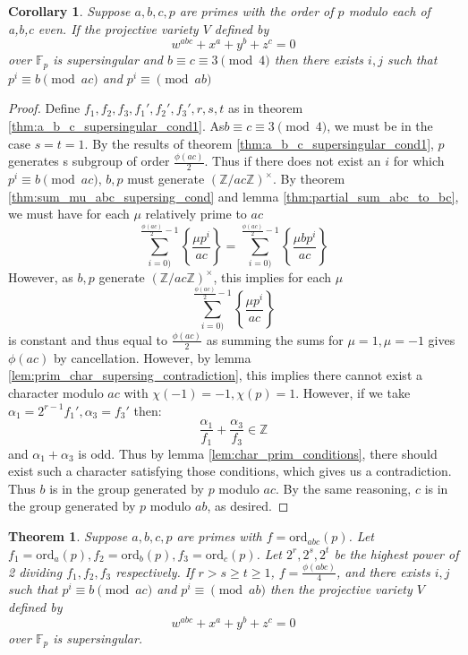 \documentclass{article}
\newcommand{\Z}{\mathbb{Z}}
\newcommand{\F}{\mathbb{F}}
\newcommand{\ord}[0]{\mathrm{ord}}
\newcommand{\frp}[2]{\left\{\frac{#1}{#2}\right\}}
\newtheorem{theorem}{Theorem}[section]
\newtheorem{corollary}{Corollary}[theorem]
\theoremstyle{definition}
\theoremstyle{definition}
\theoremstyle{remark}
\begin{document}
\begin{corollary} Suppose $a,b,c,p$ are primes with the order of $p$ modulo each of a,b,c even. If the projective variety $V$ defined by
\[w^{abc} + x^a + y^b + z^c =0\]
over $\F_p$ is supersingular and $b\equiv c \equiv 3 \pmod{4}$ then there exists $i,j$ such that $p^i \equiv b \pmod{ac}$ and $p^i \equiv \pmod{ab}$
\end{corollary}
\begin{proof}
Define $f_1, f_2, f_3, f_1', f_2', f_3', r, s, t$ as in theorem \ref{thm:a_b_c_supersingular_cond1}. As$b\equiv c \equiv 3 \pmod{4}$, we must be in the case $s=t=1$. By the results of theorem \ref{thm:a_b_c_supersingular_cond1}, $p$ generates s subgroup of order $\frac{\phi(ac)}{2}$. Thus if there does not exist an $i$ for which $p^i \equiv b \pmod{ac}$, $b,p$ must generate $(\Z/ac\Z)^{\times}$. By theorem \ref{thm:sum_mu_abc_supersing_cond} and lemma \ref{thm:partial_sum_abc_to_bc}, we must have for each $\mu$ relatively prime to $ac$
\[\sum_{i = 0)}^{\frac{\phi(ac)}{2} - 1}\frp{\mu p^i}{ac} = \sum_{i = 0)}^{\frac{\phi(ac)}{2} - 1}\frp{\mu bp^i}{ac}\]
However, as $b,p$ generate $(\Z/ac\Z)^{\times}$, this implies for each $\mu$
\[\sum_{i = 0)}^{\frac{\phi(ac)}{2} - 1}\frp{\mu p^i}{ac}\]
is constant and thus equal to $\frac{\phi(ac)}{2}$ as summing the sums for $\mu = 1, \mu = -1$ gives $\phi(ac)$ by cancellation. However, by lemma \ref{lem:prim_char_supersing_contradiction}, this implies there cannot exist a character modulo $ac$ with $\chi(-1) = -1, \chi(p) = 1$. However, if we take $\alpha_1 = 2^{r-1}f_1', \alpha_3 = f_3'$ then:
\[\frac{\alpha_1}{f_1} + \frac{\alpha_3}{f_3} \in \Z\]
and $\alpha_1 + \alpha_3$ is odd. Thus by lemma \ref{lem:char_prim_conditions}, there should exist such a character satisfying those conditions, which gives us a contradiction. Thus $b$ is in the group generated by $p$ modulo $ac$. By the same reasoning, $c$ is in the group generated by $p$ modulo $ab$, as desired.
\end{proof}


\begin{theorem}  Suppose $a,b,c,p$ are primes with $f = \ord_{abc}(p)$. Let $f_1 = \ord_a(p), f_2 = \ord_b(p), f_3 = \ord_c(p)$. Let $2^r, 2^s, 2^t$ be the highest power of 2 dividing $f_1, f_2, f_3$ respectively. If $r > s \ge t \ge 1$, $f = \frac{\phi(abc)}{4}$, and there exists $i,j$ such that $p^i \equiv b \pmod{ac}$ and $p^i \equiv \pmod{ab}$ then the projective variety $V$ defined by
\[w^{abc} + x^a + y^b + z^c =0\]
over $\F_p$ is supersingular. 
\end{theorem}
\end{document}

